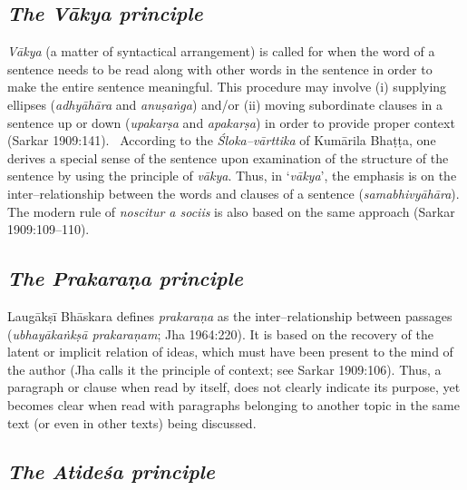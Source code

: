 \subsection*{\textit{The Vākya principle}}

\textit{Vākya} (a matter of syntactical arrangement) is called for when the word of a sentence needs to be read along with other words in the sentence in order to make the entire sentence meaningful. This procedure may involve (i) supplying ellipses (\textit{adhyāhāra} and \textit{anuṣaṅga}) and/or (ii) moving subordinate clauses in a sentence up or down (\textit{upakarṣa} and \textit{apakarṣa}) in order to provide proper context (Sarkar 1909:141).  According to the \textit{Śloka–vārttika} of Kumārila Bhaṭṭa, one derives a special sense of the sentence upon examination of the structure of the sentence by using the principle of \textit{vākya}. Thus, in ‘\textit{vākya}’, the emphasis is on the inter–relationship between the words and clauses of a sentence (\textit{samabhivyāhāra}). The modern rule of \textit{noscitur a sociis} is also based on the same approach (Sarkar 1909:109–110).


\subsection*{\textit{The Prakaraṇa principle}}

Laugākṣī Bhāskara defines \textit{prakaraṇa} as the inter–relationship between passages (\textit{ubhayākaṅkṣā prakaraṇam}; Jha 1964:220). It is based on the recovery of the latent or implicit relation of ideas, which must have been present to the mind of the author (Jha calls it the principle of context; see Sarkar 1909:106). Thus, a paragraph or clause when read by itself, does not clearly indicate its purpose, yet becomes clear when read with paragraphs belonging to another topic in the same text (or even in other texts) being discussed.


\subsection*{\textit{The Atideśa principle}}


